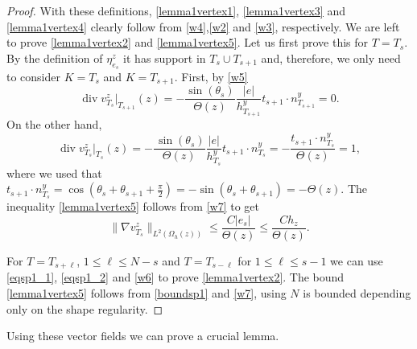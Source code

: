\documentclass[11pt]{amsart}
\numberwithin{equation}{section}
\newcommand{\dive}{\operatorname{div}}
\theoremstyle{definition}
\begin{document}
\begin{proof}
With these definitions, \eqref{lemma1vertex1}, \eqref{lemma1vertex3} and \eqref{lemma1vertex4} clearly follow from \eqref{w4},\eqref{w2} and \eqref{w3},  respectively.  We are left to prove \eqref{lemma1vertex2} and \eqref{lemma1vertex5}.  Let us first prove this for $T=T_{s}$. By the definition of $\eta_{e_s}^z$  it has support in $T_{s} \cup T_{s+1}$ and, therefore, we only need to consider $K=T_{s}$ and $K={T_{s+1}}$. First, by \eqref{w5}
\begin{equation}\label{eqsp1_1}
\dive v_{T_{s}}^z|_{T_{s+1}}(z)=-\frac{ \sin(\theta_{s})}{ \Theta(z)}   \frac{|e|}{h_{T_{s+1}}^y}  t_{s+1}  \cdot n_{T_{s+1}}^{y}=0.
\end{equation}
On the other hand,
\begin{equation}\label{eqsp1_2}
\dive v_{T_{s}}^z|_{T_{s}}(z)= -\frac{\, \sin(\theta_{s})}{ \Theta(z)}   \frac{|e|}{h_{T_{s}}^y}  t_{s+1}  \cdot n_{T_{s}}^{y} =- \frac{ t_{s+1}  \cdot n_{T_{s}}^{y}}{\Theta(z)}=1,
\end{equation}
where we used that $ t_{s+1}  \cdot n_{T_{s}}^{y}= \cos(\theta_s+\theta_{s+1}+\frac{\pi}{2})=-\sin(\theta_s+ \theta_{s+1})=-\Theta(z)$. The inequality  \eqref{lemma1vertex5} follows from \eqref{w7} to get 
\begin{equation}\label{boundsp1}
\|\nabla v_{T_{s}}^z\|_{L^2(\Omega_h(z))} \le   \frac{ C |e_{s}|} {\Theta(z)} \le \frac{ C h_z}{\Theta(z)}.
\end{equation}


For $T=T_{s+\ell}$, $1 \le \ell \le N-s $ and $T=T_{s-\ell}$ for $1 \le  \ell \le s-1$  we can use \eqref{eqsp1_1}, \eqref{eqsp1_2} and \eqref{w6} to prove \eqref{lemma1vertex2}. The bound \eqref{lemma1vertex5} follows from \eqref{boundsp1} and \eqref{w7}, using $N$ is bounded depending only on the shape regularity.  
\end{proof}












Using these vector fields we can prove a crucial lemma.  
\end{document}

